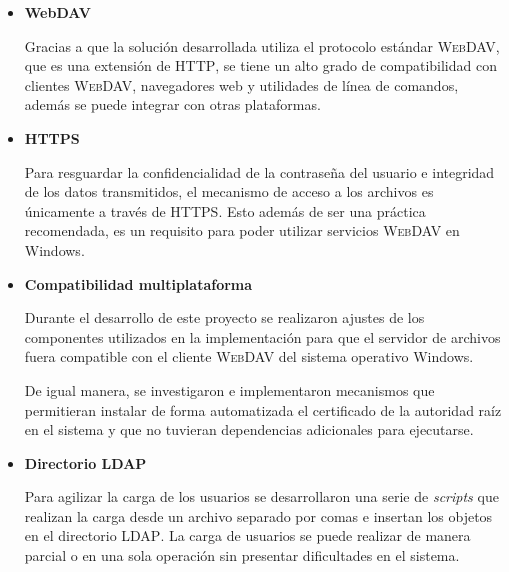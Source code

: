 \begin{itemize}
  \item \textbf{WebDAV}

Gracias a que la soluci\'{o}n desarrollada utiliza el protocolo est\'{a}ndar \textsc{WebDAV}, que es una extensi\'{o}n de \textsc{HTTP}, se tiene un alto grado de compatibilidad con clientes \textsc{WebDAV}, navegadores web y utilidades de l\'{i}nea de comandos, adem\'{a}s se puede integrar con otras plataformas.

  \item \textbf{HTTPS}

Para resguardar la confidencialidad de la contrase\~{n}a del usuario e integridad de los datos transmitidos, el mecanismo de acceso a los archivos es \'{u}nicamente a trav\'{e}s de \textsc{HTTPS}. Esto adem\'{a}s de ser una pr\'{a}ctica recomendada, es un requisito para poder utilizar servicios \textsc{WebDAV} en Windows.

  \item \textbf{Compatibilidad multiplataforma}

Durante el desarrollo de este proyecto se realizaron ajustes de los componentes utilizados en la implementaci\'{o}n para que el servidor de archivos fuera compatible con el cliente \textsc{WebDAV} del sistema operativo Windows.

De igual manera, se investigaron e implementaron mecanismos que permitieran instalar de forma automatizada el certificado de la autoridad ra\'{i}z en el sistema y que no tuvieran dependencias adicionales para ejecutarse.

  \item \textbf{Directorio LDAP}


Para agilizar la carga de los usuarios se desarrollaron una serie de \textit{scripts} que realizan la carga desde un archivo separado por comas e insertan los objetos en el directorio \textsc{LDAP}. La carga de usuarios se puede realizar de manera parcial o en una sola operaci\'{o}n sin presentar dificultades en el sistema.


\end{itemize}

